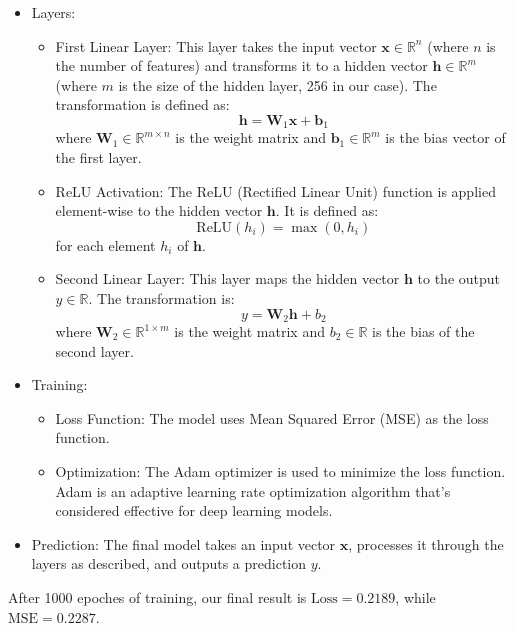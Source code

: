 \documentclass[UTF8]{mcmthesis}
\begin{document}
	\begin{itemize}
		\item Layers:
		\begin{itemize}
			\item First Linear Layer: This layer takes the input vector \( \mathbf{x} \in \mathbb{R}^{n} \) (where \( n \) is the number of features) and transforms it to a hidden vector \( \mathbf{h} \in \mathbb{R}^{m} \) (where \( m \) is the size of the hidden layer, 256 in our case). The transformation is defined as: 
			\[ \mathbf{h} = \mathbf{W}_1 \mathbf{x} + \mathbf{b}_1 \]
			where \( \mathbf{W}_1 \in \mathbb{R}^{m \times n} \) is the weight matrix and \( \mathbf{b}_1 \in \mathbb{R}^{m} \) is the bias vector of the first layer.
			\item ReLU Activation: The ReLU (Rectified Linear Unit) function is applied element-wise to the hidden vector \( \mathbf{h} \). It is defined as:
			\[ \text{ReLU}(h_i) = \max(0, h_i) \]
			for each element \( h_i \) of \( \mathbf{h} \).
			\item Second Linear Layer: This layer maps the hidden vector \( \mathbf{h} \) to the output \( y \in \mathbb{R} \). The transformation is:
			\[ y = \mathbf{W}_2 \mathbf{h} + b_2 \]
			where \( \mathbf{W}_2 \in \mathbb{R}^{1 \times m} \) is the weight matrix and \( b_2 \in \mathbb{R} \) is the bias of the second layer.
		\end{itemize}
		\item  Training:
		\begin{itemize}
			\item Loss Function: The model uses Mean Squared Error (MSE) as the loss function.
			\item Optimization: The Adam optimizer is used to minimize the loss function. Adam is an adaptive learning rate optimization algorithm that's considered effective for deep learning models.
		\end{itemize}
		\item Prediction: The final model takes an input vector \( \mathbf{x} \), processes it through the layers as described, and outputs a prediction \( y \).		
	\end{itemize}
	
	After 1000 epoches of training, our final result is $\text{Loss}=0.2189$, while $\text{MSE}=0.2287$. 
	
\end{document}
